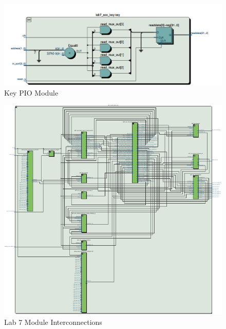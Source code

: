 \documentclass[journal, twocolumn, final,11pt,letterpaper]{IEEEtran}
\begin{document}
\begin{figure} [H]
	\centering
	\includegraphics[scale=0.4]{key_pio_module.png}
	\caption{Key PIO Module\label{fig:key-pio}}
\end{figure}

\begin{figure} [H]
	\centering
	\includegraphics[scale=1.72]{top-level-circuit.pdf}
	\caption{Lab 7 Module Interconnections\label{fig:top-level-interconn}}
\end{figure}


\end{document}
